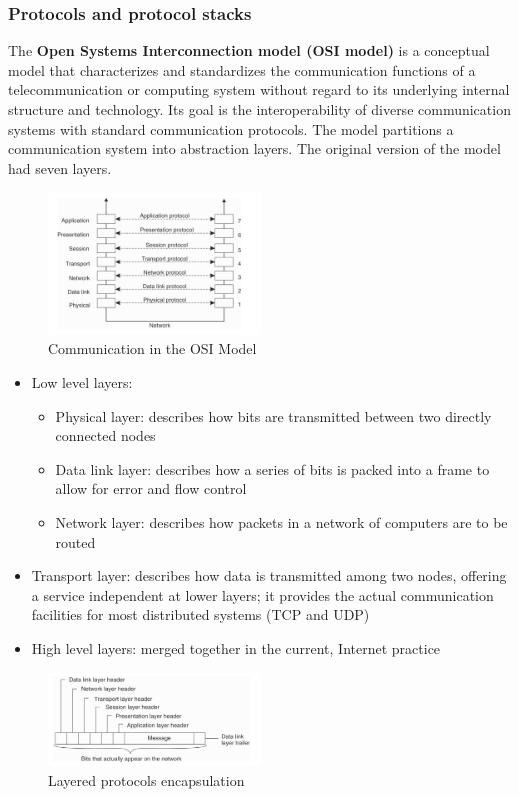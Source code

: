 \documentclass[10pt,a4paper]{article}
\begin{document}
\subsubsection{Protocols and protocol stacks}
The \textbf{Open Systems Interconnection model (OSI model)} is a conceptual model that characterizes and standardizes the communication functions of a telecommunication or computing system without regard to its underlying internal structure and technology. Its goal is the interoperability of diverse communication systems with standard communication protocols. The model partitions a communication system into abstraction layers. The original version of the model had seven layers.
\begin{figure}[h!]
 \hfill \includegraphics[width=160pt]{images/osi.png}\hspace*{\fill}
 \caption{Communication in the OSI Model}
  \label{fig:osi}
\end{figure}
\begin{itemize}
	\item Low level layers:
		\begin{itemize}
			\item Physical layer: describes how bits are transmitted between two directly connected nodes
			\item Data link layer: describes how a series of bits is packed into a frame to allow for error and flow control
			\item Network layer: describes how packets in a network of computers are to be routed
		\end{itemize}
	\item Transport layer: describes how data is transmitted among two nodes, offering a service independent at lower layers; it provides the actual communication facilities for most distributed systems (TCP and UDP)
	\item High level layers: merged together in the current, Internet practice
\end{itemize}
\begin{figure}[h!]
 \hfill \includegraphics[width=160pt]{images/encapsulation.png}\hspace*{\fill}
 \caption{Layered protocols encapsulation}
  \label{fig:encapsulation}
\end{figure}
\end{document}
